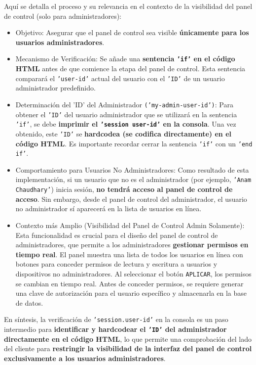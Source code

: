 \documentclass{report}
\begin{document}
Aquí se detalla el proceso y su relevancia en el contexto de la visibilidad del panel de control (solo para administradores):
\begin{itemize}
    \item Objetivo: Asegurar que el panel de control sea visible \textbf{únicamente para los usuarios administradores}.
    \item Mecanismo de Verificación: Se añade una \textbf{sentencia \texttt{'if'} en el código HTML} antes de que comience la etapa del panel de control. 
          Esta sentencia comparará el \texttt{'user-id'} actual del usuario con el \texttt{'ID'} de un usuario administrador predefinido.
    \item Determinación del 'ID' del Administrador \texttt{('my-admin-user-id')}: Para obtener el \texttt{'ID'} del usuario administrador que se utilizará 
          en la sentencia \texttt{'if'}, se debe \textbf{imprimir el \texttt{'session user-id'} en la consola}. Una vez obtenido, este \texttt{'ID'} se
          \textbf{hardcodea (se codifica directamente) en el código HTML}. Es importante recordar cerrar la sentencia \texttt{'if'} con un \texttt{'end if'}.
    \item Comportamiento para Usuarios No Administradores: Como resultado de esta implementación, si un usuario que no es el administrador (por ejemplo, 
          \texttt{'Anam Chaudhary'}) inicia sesión, \textbf{no tendrá acceso al panel de control de acceso}. Sin embargo, desde el panel de control del 
          administrador, el usuario no administrador sí aparecerá en la lista de usuarios en línea.
    \item Contexto más Amplio (Visibilidad del Panel de Control Admin Solamente): Esta funcionalidad es crucial para el diseño del panel de control de 
          administradores, que permite a los administradores \textbf{gestionar permisos en tiempo real}. El panel muestra una lista de todos los usuarios 
          en línea con botones para conceder permisos de lectura y escritura a usuarios y dispositivos no administradores. Al seleccionar el botón 
          \texttt{APLICAR}, los permisos se cambian en tiempo real. Antes de conceder permisos, se requiere generar una clave de autorización para el 
          usuario específico y almacenarla en la base de datos.
\end{itemize}

En síntesis, la verificación de \texttt{'session.user-id'} en la consola es un paso intermedio para \textbf{identificar y hardcodear el \texttt{'ID'} 
del administrador directamente en el código HTML}, lo que permite una comprobación del lado del cliente para \textbf{restringir la visibilidad de la 
interfaz del panel de control exclusivamente a los usuarios administradores}.
\end{document}
